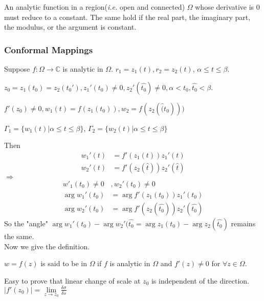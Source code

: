 
\begin{theorem}
    An analytic function in a region(\textit{i.e.} open and connected) $ \Omega $ whose derivative is 0 must reduce to a constant. The same hold if the real part, the imaginary part, the modulus, or the argument is constant.
\end{theorem}
\subsubsection{Conformal Mappings}
Suppose  $ f:\Omega\rightarrow \mathbb{C}$ is analytic in  $ \Omega $.  $ r_1=z_1(t),r_2=z_2(t) $, $ \alpha \leq t \leq \beta $.

 $ z_0=z_1(t_0)=z_2(t_0') ,z_1'(t_0)\neq0,z_2'(\hat{t_0})\neq0,\alpha<t_0,\hat{t_0}<\beta$.
 
  $ f'(z_0)\neq0, w_1(t)=f(z_1(t_0)),w_2=f(z_2(\hat(t_0))) $
  
   $ \Gamma_1=\{w_1(t)|\alpha \leq t \leq \beta\} $,  $ \Gamma_2=\{w_2(t)|\alpha \leq t \leq \beta\}$        
   
Then 
\begin{align*}
    w_1'(t)&=f'(z_1(t))z_1'(t)\\
    w_2'(t)&=f'(z_2(\hat{t}))z_2'(\hat{t})
\end{align*}
 $ \Rightarrow  $
 \begin{align*}
    w'_1(t_0)\neq0&,w_2'(t_0)\neq0\\
    \arg w_1'(t_0)&=\arg f'(z_1(t_0))z_1'(t_0)\\
    \arg w_2'(t_0)&=\arg f'(z_2(\hat{t_0}))z_2'(\hat{t_0})
 \end{align*} 
So the "angle"  $ \arg w_1'(t_0)-\arg w_2'(\hat{t_0}=\arg z_1(t_0)-\arg z_2(\hat{t_0}) $ remains the same. \\
Now we give the definition.
\begin{definition}
     $ w=f(z) $ is said to be  in  $ \Omega $ if  $ f  $ is analytic in  $ \Omega  $ and  $ f'(z)\neq0 $ for  $ \forall z\in \Omega$.    
\end{definition}
Easy to prove that linear change of scale at  $ z_0 $  is independent of the direction.\\
\ie  $ |f'(z_0)|=\lim\limits_{z\to z_0}\frac{\delta \sigma}{\delta s} $ 
